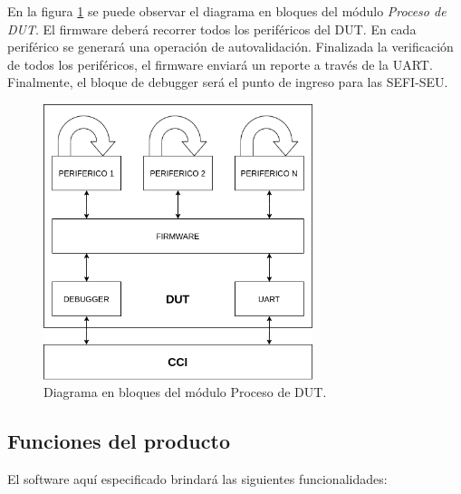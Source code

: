 \documentclass[
11pt, %
codirector, %
]{charter}
\begin{document}
En la figura \ref{fig:DUTbloques} se puede observar el diagrama en bloques del módulo \emph{Proceso de DUT}.
El firmware deberá recorrer todos los periféricos del DUT.
En cada periférico se generará una operación de autovalidación.
Finalizada la verificación de todos los periféricos, el firmware enviará un reporte a través de la UART.
Finalmente, el bloque de debugger será el punto de ingreso para las SEFI-SEU.

\begin{figure}[h!]
	\centering
	\includegraphics[width=0.7\textwidth]{./Figuras/DUTbloques.png}
	\caption{Diagrama en bloques del módulo Proceso de DUT.}
	\label{fig:DUTbloques}
\end{figure}

\subsection{Funciones del producto}
\label{sub:funcionesProducto}

El software aquí especificado brindará las siguientes funcionalidades:
\end{document}
